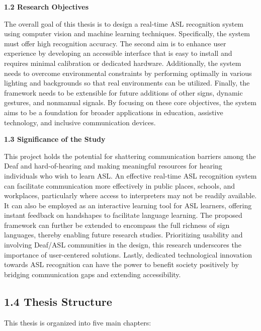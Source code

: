 \documentclass[12pt]{article}
\begin{document}
\vspace{1.5em}
\noindent
\textbf{1.2 Research Objectives}
\vspace{1.5em}

The overall goal of this thesis is to design a real-time ASL recognition system using
computer vision and machine learning techniques. Specifically, the system must offer high
recognition accuracy. The second aim is to enhance user experience by developing an accessible
interface that is easy to install and requires minimal calibration or dedicated hardware. 
Additionally, the system needs to overcome environmental constraints by performing optimally
in various lighting and backgrounds so that real environments can be utilized. Finally, 
the framework needs to be extensible for future additions of other signs, dynamic gestures,
and nonmanual signals. By focusing on these core objectives, the system aims to be a foundation
for broader applications in education, assistive technology, and inclusive communication 
devices.

\vspace{1.5em}
\noindent
\textbf{1.3 Significance of the Study}
\vspace{1.5em}

This project holds the potential for shattering communication barriers among the Deaf 
and hard-of-hearing and making meaningful resources for hearing individuals who wish to
learn ASL. An effective real-time ASL recognition system can facilitate communication more
effectively in public places, schools, and workplaces, particularly where access to interpreters
may not be readily available. It can also be employed as an interactive learning tool for ASL
learners, offering instant feedback on handshapes to facilitate language learning. The proposed
framework can further be extended to encompass the full richness of sign languages, 
thereby enabling future research studies. Prioritizing usability and involving Deaf/ASL 
communities in the design, this research underscores the importance of user-centered solutions.
Lastly, dedicated technological innovation towards ASL recognition can have the power to 
benefit society positively by bridging communication gaps and extending accessibility.

\vspace{1.5em}
\noindent
\subsection*{1.4 Thesis Structure}
\noindent
This thesis is organized into five main chapters:
\end{document}
